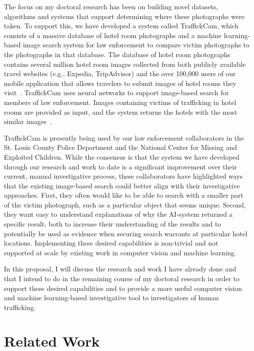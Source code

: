 \documentclass[12pt]{article}
\begin{document}
The focus on my doctoral research has been on building novel datasets, algorithms and systems that support determining where these photographs were taken. To support this, we have developed a system called TraffickCam, which consists of a massive database of hotel room photographs and a machine learning-based image search system for law enforcement to compare victim photographs to the photographs in that database. The database of hotel room photographs contains several million hotel room images collected from both publicly available travel websites (e.g., Expedia, TripAdvisor) and the over 100,000 users of our mobile application that allows travelers to submit images of hotel rooms they visit~\cite{aipr2015}. TraffickCam uses neural networks to support image-based search for members of law enforcement. Images containing victims of trafficking in hotel rooms are provided as input, and the system returns the hotels with the most similar images~\cite{aipr2017}.

TraffickCam is presently being used by our law enforcement collaborators in the St. Louis County Police Department and the National Center for Missing and Exploited Children. While the consensus is that the system we have developed through our research and work to date is a significant improvement over their current, manual investigative process, these collaborators have highlighted ways that the existing image-based search could better align with their investigative approaches. First, they often would like to be able to search with a smaller part of the victim photograph, such as a particular object that seems unique. Second, they want easy to understand explanations of why the AI-system returned a specific result, both to increase their understanding of the results and to potentially be used as evidence when securing search warrants at particular hotel locations. Implementing these desired capabilities is non-trivial and not supported at scale by existing work in computer vision and machine learning.

In this proposal, I will discuss the research and work I have already done and that I intend to do in the remaining course of my doctoral research in order to support these desired capabilities and to provide a more useful computer vision and machine learning-based investigative tool to investigators of human trafficking.

\section{Related Work}
\end{document}

